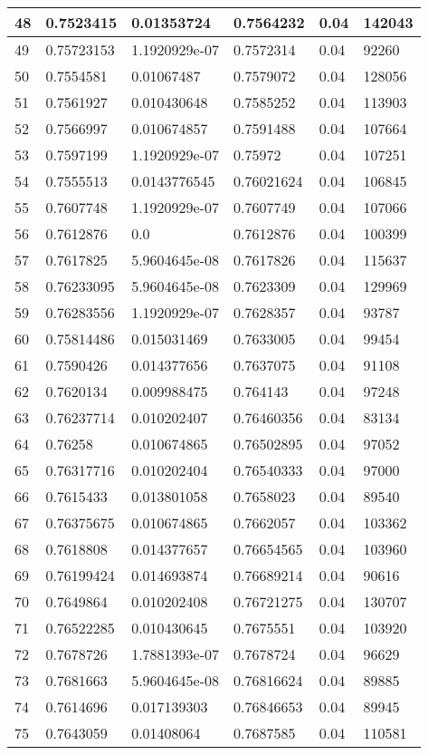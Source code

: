\begin{longtable}{|l|l|l|l|l|l|}
48 & 0.7523415 & 0.01353724 & 0.7564232 & 0.04 & 142043 \\ \hline 
49 & 0.75723153 & 1.1920929e-07 & 0.7572314 & 0.04 & 92260 \\ \hline 
50 & 0.7554581 & 0.01067487 & 0.7579072 & 0.04 & 128056 \\ \hline 
51 & 0.7561927 & 0.010430648 & 0.7585252 & 0.04 & 113903 \\ \hline 
52 & 0.7566997 & 0.010674857 & 0.7591488 & 0.04 & 107664 \\ \hline 
53 & 0.7597199 & 1.1920929e-07 & 0.75972 & 0.04 & 107251 \\ \hline 
54 & 0.7555513 & 0.0143776545 & 0.76021624 & 0.04 & 106845 \\ \hline 
55 & 0.7607748 & 1.1920929e-07 & 0.7607749 & 0.04 & 107066 \\ \hline 
56 & 0.7612876 & 0.0 & 0.7612876 & 0.04 & 100399 \\ \hline 
57 & 0.7617825 & 5.9604645e-08 & 0.7617826 & 0.04 & 115637 \\ \hline 
58 & 0.76233095 & 5.9604645e-08 & 0.7623309 & 0.04 & 129969 \\ \hline 
59 & 0.76283556 & 1.1920929e-07 & 0.7628357 & 0.04 & 93787 \\ \hline 
60 & 0.75814486 & 0.015031469 & 0.7633005 & 0.04 & 99454 \\ \hline 
61 & 0.7590426 & 0.014377656 & 0.7637075 & 0.04 & 91108 \\ \hline 
62 & 0.7620134 & 0.009988475 & 0.764143 & 0.04 & 97248 \\ \hline 
63 & 0.76237714 & 0.010202407 & 0.76460356 & 0.04 & 83134 \\ \hline 
64 & 0.76258 & 0.010674865 & 0.76502895 & 0.04 & 97052 \\ \hline 
65 & 0.76317716 & 0.010202404 & 0.76540333 & 0.04 & 97000 \\ \hline 
66 & 0.7615433 & 0.013801058 & 0.7658023 & 0.04 & 89540 \\ \hline 
67 & 0.76375675 & 0.010674865 & 0.7662057 & 0.04 & 103362 \\ \hline 
68 & 0.7618808 & 0.014377657 & 0.76654565 & 0.04 & 103960 \\ \hline 
69 & 0.76199424 & 0.014693874 & 0.76689214 & 0.04 & 90616 \\ \hline 
70 & 0.7649864 & 0.010202408 & 0.76721275 & 0.04 & 130707 \\ \hline 
71 & 0.76522285 & 0.010430645 & 0.7675551 & 0.04 & 103920 \\ \hline 
72 & 0.7678726 & 1.7881393e-07 & 0.7678724 & 0.04 & 96629 \\ \hline 
73 & 0.7681663 & 5.9604645e-08 & 0.76816624 & 0.04 & 89885 \\ \hline 
74 & 0.7614696 & 0.017139303 & 0.76846653 & 0.04 & 89945 \\ \hline 
75 & 0.7643059 & 0.01408064 & 0.7687585 & 0.04 & 110581 \\ \hline 
\end{longtable}